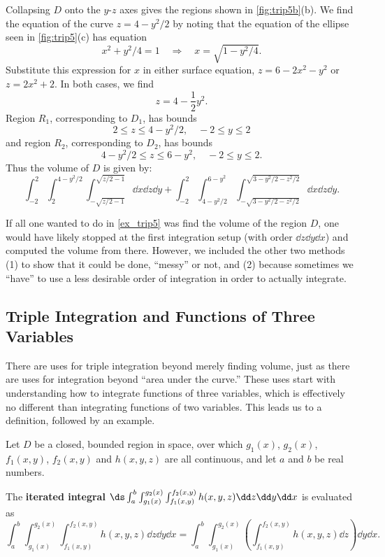 \begin{example}
Collapsing $D$ onto the $y$-$z$ axes gives the regions shown in \autoref{fig:trip5b}(b). We find the equation of the curve $z=4-y^2/2$ by noting that the equation of the ellipse seen in \autoref{fig:trip5}(c) has equation 
\[x^2+y^2/4=1 \quad \Rightarrow \quad x = \sqrt{1-y^2/4}.\]  
Substitute this expression for $x$ in either surface equation, $z=6-2x^2-y^2$ or $z=2x^2+2$. In both cases, we find
\[z=4-\frac12y^2.\]
Region $R_1$, corresponding to $D_1$, has bounds
\[2\leq z\leq 4-y^2/2,\quad -2\leq y\leq 2\]
and region $R_2$, corresponding to $D_2$, has bounds
\[4-y^2/2\leq z\leq 6-y^2,\quad -2\leq y\leq 2.\]
Thus the volume of $D$ is given by:
\[\int_{-2}^2\int_2^{4-y^2/2}\int_{-\sqrt{z/2-1}}^{\sqrt{z/2-1}}\dd x\dd z\dd y +\int_{-2}^2\int_{4-y^2/2}^{6-y^2}\int_{-\sqrt{3-y^2/2-z^2/2}}^{\sqrt{3-y^2/2-z^2/2}}\dd x\dd z\dd y.\]
\end{example}

If all one wanted to do in \autoref{ex_trip5} was find the volume of the region $D$, one would have likely stopped at the first integration setup (with order $\dd z\dd y\dd x$) and computed the volume from there. However, we included the other two methods (1) to show that it could be done, ``messy'' or not, and (2) because sometimes we ``have'' to use a less desirable order of integration in order to actually integrate.

\subsection{Triple Integration and Functions of Three Variables}

There are uses for triple integration beyond merely finding volume, just as there are uses for integration beyond ``area under the curve.'' These uses start with understanding how to integrate functions of three variables, which is effectively no different than integrating functions of two variables. This leads us to a definition, followed by an example.

{
\begin{definition}\label{def:triple_integral_2}
Let $D$ be a closed, bounded region in space, over which $g_1(x)$, $g_2(x)$, $f_1(x,y)$, $f_2(x,y)$ and $h(x,y,z)$ are all continuous, and let $a$ and $b$ be real numbers.\bigskip

The \textbf{iterated integral} $\ds \int_a^b\int_{g_1(x)}^{g_2(x)}\int_{f_1(x,y)}^{f_2(x,y)} h(x,y,z)\dd z\dd y\dd x$ is evaluated as
\small
\[
\int_a^b\int_{g_1(x)}^{g_2(x)}\int_{f_1(x,y)}^{f_2(x,y)} h(x,y,z)\dd z\dd y\dd x
= \int_a^b\int_{g_1(x)}^{g_2(x)}\left(\int_{f_1(x,y)}^{f_2(x,y)} h(x,y,z)\dd z\right)\dd y\dd x.
\]
\end{definition}}

